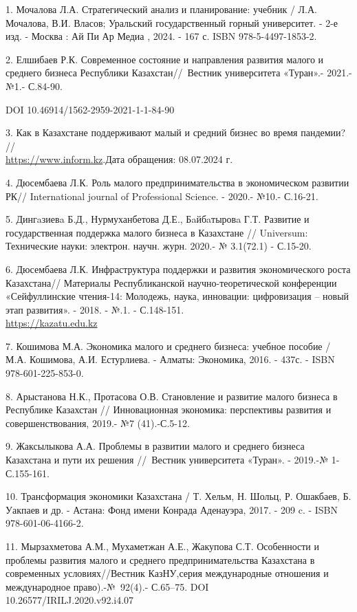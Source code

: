 \begin{references}
1. Мочалова Л.А. Стратегический анализ и планирование: учебник / Л.А.
Мочалова, В.И. Власов; Уральский государственный горный университет. -
2-е изд. - Москва : Ай Пи Ар Медиа , 2024. - 167 с. ISBN
978-5-4497-1853-2.

2. Елшибаев Р.К. Современное состояние и направления развития малого и
среднего бизнеса Республики Казахстан//~Вестник университета «Туран».-
2021.-№1.- С.84-90.~

DOI 10.46914/1562-2959-2021-1-1-84-90

3. Как в Казахстане поддерживают малый и средний бизнес во время
пандемии?
//\\\href{https://www.inform.kz/ru/kak-v-kazahstane-podderzhivayut-malyy-i-sredniy-biznes-vo-vremya-pandemii\_a3694302}{https://www.inform.kz}.Дата
обращения: 08.07.2024 г.

4. Дюсембаева Л.К. Роль малого предпринимательства в экономическом
развитии РК// International journal of Professional Science. - 2020.-
№10.- С.16-21.

5. Дингaзиевa Б.Д., Нурмуханбетова Д.Е., Бaйбaтыровa Г.Т. Развитие и
государственная поддержка малого бизнеса в Казахстане // Universum:
Технические науки: электрон. научн. журн. 2020.- № 3.1(72.1) - С.15-20.

6. Дюсембаева Л.К. Инфраструктура поддержки и развития экономического
роста Казахстана// Материалы Республиканской научно-теоретической
конференции «Сейфуллинские чтения-14: Молодежь, наука, инновации:
цифровизация -- новый этап развития». - 2018. - №.1. - С.148-151.
\\\href{https://kazatu.edu.kz/assets/i/science/sf14\_mat\_104.pdf}{https://kazatu.edu.kz}

7. Кошимова М.А. Экономика малого и среднего бизнеса: учебное пособие /
М.А. Кошимова, А.И. Естурлиева. - Алматы: Экономика, 2016. - 437с. -
ISBN 978-601-225-853-0.

8. Арыстанова Н.К., Протасова О.В. Становление и развитие малого бизнеса
в Республике Казахстан // Инновационная экономика: перспективы развития
и совершенствования, 2019.- №7 (41).-С.5-12.

9. Жаксылыкова А.А. Проблемы в развитии малого и среднего бизнеса
Казахстана и пути их решения //~Вестник университета «Туран». - 2019.-№
1-С.155-161.

10. Трансформация экономики Казахстана / Т. Хельм, Н. Шольц, Р.
Ошакбаев, Б. Уакпаев и др. - Астана: Фонд имени Конрада Аденауэра, 2017.
- 209 c. - ISBN 978-601-06-4166-2.

11. Мырзахметова А.М., Мухаметжан А.Е., Жакупова С.Т. Особенности и
проблемы развития малого и среднего предпринимательства Казахстана в
современных условиях//Вестник КазНУ,серия международные отношения и
международное право).-№~92(4).- С.65--75. DOI\\
10.26577/IRILJ.2020.v92.i4.07
\end{references}

